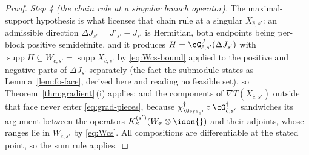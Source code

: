 \begin{proof}
\emph{Step 4 (the chain rule at a singular branch operator).} The
maximal-support hypothesis is what licenses that chain rule at a singular
$X_{\hat c,s'}$: an admissible direction
$\Delta J_{s'}=J'_{s'}-J_{s'}$ is Hermitian, both endpoints being
per-block positive semidefinite, and it produces
$H=\cG^{J}_{\hat c,s'}(\Delta J_{s'})$ with
$\operatorname{supp}H\subseteq W_{\hat c,s'}
=\operatorname{supp}X_{\hat c,s'}$ by \eqref{eq:Wcs-bound} applied to the
positive and negative parts of $\Delta J_{s'}$ separately (the fact the
submodule states as Lemma~\ref{lem:fo-face}, derived here and reading no
feasible set), so Theorem~\ref{thm:gradient}\,(i) applies; and the
components of $\nabla T(X_{\hat c,s'})$ outside that face never enter
\eqref{eq:grad-pieces}, because
$\chi^{\dagger}_{\Qsys_{s'}}\circ\cG^{\dagger}_{\hat c,s'}$ sandwiches its
argument between the operators
$K^{(s')}_{\kappa}(W_{\tau}\otimes\idon{})$ and their adjoints, whose
ranges lie in $W_{\hat c,s'}$ by \eqref{eq:Wcs}. All compositions are
differentiable at the stated point, so the sum rule applies.
\end{proof}
